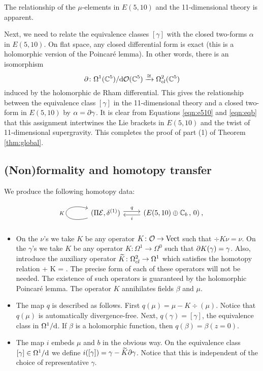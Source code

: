 The relationship of the $\mu$-elements in $E(5,10)$ and the 11-dimensional theory is apparent.

Next, we need to relate the equivalence classes $[\gamma]$ with the closed two-forms $\alpha$ in $E(5,10)$. 
On flat space, any closed differential form is exact (this is a holomorphic version of the Poincar\'e lemma). 
In other words, there is an isomorphism
\[
\partial \colon \Omega^1 (\mathbb C^5) / {\rm d} \mathcal O(\mathbb C^5) \xrightarrow{\cong} \Omega^{2}_{cl}(\mathbb C^5)
\]
induced by the holomorphic de Rham differential.
This gives the relationship between the equivalence class $[\gamma]$ in the 11-dimensional theory and a closed two-form in $E(5,10)$ by $\alpha = \partial \gamma$. 
It is clear from Equations \eqref{eqn:e510} and \eqref{eqn:eqb} that this assignment intertwines the Lie brackets in $E(5,10)$ and the twist of 11-dimensional supergravity. 
This completes the proof of part (1) of Theorem \ref{thm:global}.

\subsection{(Non)formality and homotopy transfer} 
\label{s:ht}

We produce the following homotopy data:
\begin{equation}
\begin{tikzcd}
\arrow[loop left]{l}{K}(\Pi \cE , \delta^{(1)})\arrow[r, shift left, "q"] &(E(5,10) \oplus \CC_b \, , \, 0)\arrow[l, shift left, "i"] \: ,
\end{tikzcd}
\end{equation}

\begin{itemize}
\item On the $\nu$'s we take $K$ be any operator $K \colon \mathcal O \to {\rm Vect}$ such that $\div K \nu = \nu$. 
On the $\gamma$'s we take $K$ be any operator $K \colon \Omega^1 \to \Omega^0$ such that $\partial K(\gamma) = \gamma$. 
Also, introduce the auxiliary operator $\widetilde{K} \colon \Omega^2_{cl} \to \Omega^1$ which satisfies the homotopy relation
\beqn\label{eqn:htpy1}
 \del \gamma + \del K \gamma = \gamma . 
\eeqn
The precise form of each of these operators will not be needed.
The existence of such operators is guaranteed by the holomorphic Poincar\'e lemma.
The operator $K$ annihilates fields $\beta$ and $\mu$. 
\item 
The map $q$ is described as follows. 
First $q(\mu) = \mu - K \div (\mu)$.
Notice that $q(\mu)$ is automatically divergence-free.
Next, $q(\gamma) = [\gamma]$, the equivalence class in $\Omega^1 / {\rm d}$. 
If $\beta$ is a holomorphic function, then $q(\beta) = \beta (z=0)$.
\item 
The map $i$ embeds $\mu$ and $b$ in the obvious way.
On the equivalence class $[\gamma] \in \Omega^1 / {\rm d}$ we define $i([\gamma]) = \gamma - \widetilde{K} \partial \gamma$. 
Notice that this is independent of the choice of representative $\gamma$. 
\end{itemize}

